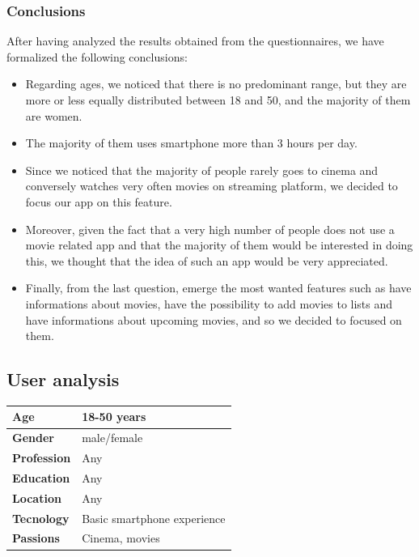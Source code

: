 \documentclass[12pt, a4paper]{article}
\begin{document}
\subsubsection{Conclusions}
After having analyzed the results obtained from the questionnaires, we have formalized the following conclusions:
\begin{itemize}
\setlength\itemsep{0.01em}
	\item Regarding ages, we noticed that there is no predominant range, but they are more or less equally distributed between 18 and 50, and the majority of them are women.
	\item The majority of them uses smartphone more than 3 hours per day.
	\item Since we noticed that the majority of people rarely goes to cinema and conversely watches very often movies on streaming platform, we decided to focus our app on this feature. 
	\item Moreover, given the fact that a very high number of people does not use a movie related app and that the majority of them would be interested in doing this, we thought that the idea of such an app would be very appreciated.
	\item Finally, from the last question, emerge the most wanted features such as have informations about movies, have the possibility to add movies to lists and have informations about upcoming movies, and so we decided to focused on them.
\end{itemize}


\subsection{User analysis}

\begin{center}
	\begin{tabular}{ |p{3cm}|P{7cm}|  }
		\hline
		\textbf{Age}			& 	18-50 years  				\\
		\hline
		\textbf{Gender}			& 	male/female					\\
		\hline
		\textbf{Profession} 	&	Any							\\
		\hline
		\textbf{Education} 	 	&	Any							\\
		\hline
		\textbf{Location}		&	Any							\\
		\hline
		\textbf{Tecnology}		&	Basic smartphone experience	\\
		\hline
		\textbf{Passions}		&	Cinema, movies				\\
		\hline
	\end{tabular}
\end{center}
\end{document}
